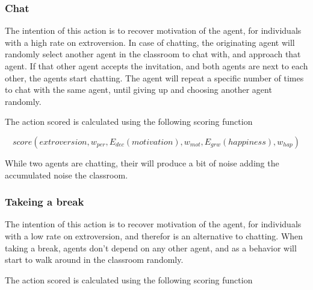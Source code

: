 \begin{figure}[!h]
    \label{Equatin_figures}
\end{figure}

\subsubsection{Chat}
The intention of this action is to recover motivation of the agent, for individuals
with a high rate on extroversion. In case of chatting, the originating agent will
randomly select another agent in the classroom to chat with, and approach that agent.
If that other agent accepts the invitation, and both agents are next to each other,
the agents start chatting. The agent will repeat a specific number of times to
chat with the same agent, until giving up and choosing another agent randomly.

The action scored is calculated using the following scoring function

\begin{equation}
    score(extroversion, w_{per}, E_{dec}(motivation), w_{mot}, E_{grw}(happiness), w_{hap})
\end{equation}

While two agents are chatting, their will produce a bit of noise adding the accumulated noise the classroom.

\subsubsection{Takeing a break}
The intention of this action is to recover motivation of the agent, for individuals
with a low rate on extroversion, and therefor is an alternative to chatting.
When taking a break, agents don't depend on any other agent, and as a behavior
will start to walk around in the classroom randomly. 

The action scored is calculated using the following scoring function

